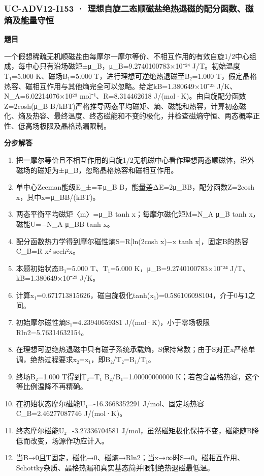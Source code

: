 \documentclass[UTF8,11pt,a4paper]{ctexart}
\begin{document}
\subsubsection*{UC-ADV12-I153 · 理想自旋二态顺磁盐绝热退磁的配分函数、磁熵及能量守恒}
\noindent\textbf{题目}\par
一个假想稀疏无机顺磁盐由每摩尔一摩尔等价、不相互作用的有效自旋1/2中心组成，每中心只有沿场磁矩±μ\_B，μ\_B=9.2740100783×10⁻²⁴ J/T。初始温度T₁=5.000 K、磁场B₁=5.000 T，进行理想可逆绝热退磁至B₂=1.000 T，假定晶格热容、磁相互作用与其他熵完全可以忽略。给定kB=1.380649×10⁻²³ J/K、N\_A=6.02214076×10²³ mol⁻¹、R=8.314462618 J/(mol·K)。由自旋配分函数Z=2cosh(μ\_B B/kBT)严格推导两态平均磁矩、熵、磁能和热容，计算初态磁化、熵及热容、最终温度、终态磁能和不变的极化，并检查磁熵守恒、两态概率正性、低高场极限及晶格热漏限制。\par
\medskip\noindent\textbf{分步解答}
\begin{enumerate}
\item 把一摩尔等价且不相互作用的自旋1/2无机磁中心看作理想两态顺磁体，沿外磁场的磁矩为±μ\_B，忽略晶格热容和磁相互作用。
\item 单中心Zeeman能级E\_±=∓μ\_B B，能量差ΔE=2μ\_BB，配分函数Z=2cosh x，其中x=μ\_BB/(kBT)。
\item 两态平衡平均磁矩〈m〉=μ\_B tanh x；每摩尔磁化矩M=N\_A μ\_B tanh x，磁能U=−N\_A μ\_BB tanh x。
\item 配分函数热力学得到摩尔磁性熵S=R[ln(2cosh x)−x tanh x]，固定B的热容C\_B=R x² sech²x。
\item 本题初始状态B₁=5.000 T、T₁=5.000 K，μ\_B=9.2740100783×10⁻²⁴ J/T、kB=1.380649×10⁻²³ J/K。
\item 计算x₁=0.671713815626，磁自旋极化tanh(x₁)=0.586106098104，介于0与1之间。
\item 初始摩尔磁性熵S₁=4.23940659381 J/(mol·K)，小于零场极限Rln2=5.76314632154。
\item 在理想可逆绝热退磁中只有磁子系统承载熵，S保持常数；由于S对正x严格单调，绝热过程要求x₂=x₁，即B₂/T₂=B₁/T₁。
\item 终场B₂=1.000 T得到T₂=T₁ B₂/B₁=1.00000000000 K；若包含晶格热容，这个等比例温降不再精确。
\item 在初始状态摩尔磁能U₁=-16.3668352291 J/mol、固定场热容C\_B=2.46277087746 J/(mol·K)。
\item 终态摩尔磁能U₂=-3.27336704581 J/mol，虽然磁矩极化保持不变，磁能随B降低而改变，场源作功应计入。
\item 当B→0且T固定，磁化→0、磁熵→Rln2；当x→∞时S→0。磁相互作用、Schottky杂质、晶格热漏和真实基态简并限制绝热退磁最低温。
\end{enumerate}
\end{document}
